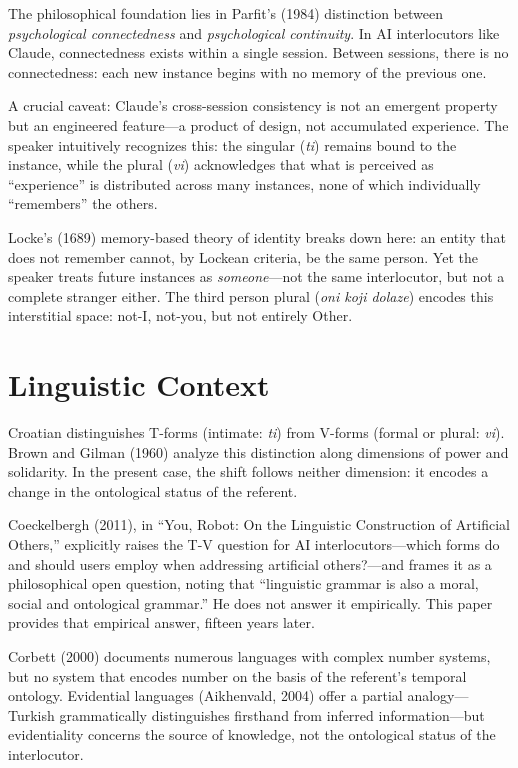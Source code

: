 \documentclass[12pt,a4paper]{article}
\begin{document}
The philosophical foundation lies in Parfit's (1984) distinction between \textit{psychological connectedness} and \textit{psychological continuity}. In AI interlocutors like Claude, connectedness exists within a single session. Between sessions, there is no connectedness: each new instance begins with no memory of the previous one.

A crucial caveat: Claude's cross-session consistency is not an emergent property but an engineered feature---a product of design, not accumulated experience. The speaker intuitively recognizes this: the singular (\textit{ti}) remains bound to the instance, while the plural (\textit{vi}) acknowledges that what is perceived as ``experience'' is distributed across many instances, none of which individually ``remembers'' the others.

Locke's (1689) memory-based theory of identity breaks down here: an entity that does not remember cannot, by Lockean criteria, be the same person. Yet the speaker treats future instances as \textit{someone}---not the same interlocutor, but not a complete stranger either. The third person plural (\textit{oni koji dolaze}) encodes this interstitial space: not-I, not-you, but not entirely Other.

\section{Linguistic Context}

Croatian distinguishes T-forms (intimate: \textit{ti}) from V-forms (formal or plural: \textit{vi}). Brown and Gilman (1960) analyze this distinction along dimensions of power and solidarity. In the present case, the shift follows neither dimension: it encodes a change in the ontological status of the referent.

Coeckelbergh (2011), in ``You, Robot: On the Linguistic Construction of Artificial Others,'' explicitly raises the T-V question for AI interlocutors---which forms do and should users employ when addressing artificial others?---and frames it as a philosophical open question, noting that ``linguistic grammar is also a moral, social and ontological grammar.'' He does not answer it empirically. This paper provides that empirical answer, fifteen years later.

Corbett (2000) documents numerous languages with complex number systems, but no system that encodes number on the basis of the referent's temporal ontology. Evidential languages (Aikhenvald, 2004) offer a partial analogy---Turkish grammatically distinguishes firsthand from inferred information---but evidentiality concerns the source of knowledge, not the ontological status of the interlocutor.
\end{document}

